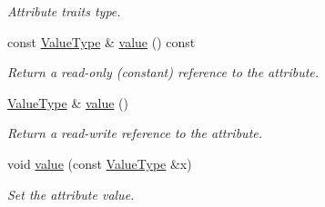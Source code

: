 \begin{DoxyCompactItemize}
\begin{DoxyCompactList}\small\item\em Attribute traits type. \item\end{DoxyCompactList}\item 
const \hyperlink{classopenstack_1_1xml_1_1AbsoluteLimit_ade5fbfd6ef570b66c9ad22f8339ef3f6}{ValueType} \& \hyperlink{classopenstack_1_1xml_1_1AbsoluteLimit_a6173fefecefbf3fb5f984ea1293c6eea}{value} () const 
\begin{DoxyCompactList}\small\item\em Return a read-\/only (constant) reference to the attribute. \item\end{DoxyCompactList}\item 
\hyperlink{classopenstack_1_1xml_1_1AbsoluteLimit_ade5fbfd6ef570b66c9ad22f8339ef3f6}{ValueType} \& \hyperlink{classopenstack_1_1xml_1_1AbsoluteLimit_a452c4de729595bbce70455276d4f9fed}{value} ()
\begin{DoxyCompactList}\small\item\em Return a read-\/write reference to the attribute. \item\end{DoxyCompactList}\item 
void \hyperlink{classopenstack_1_1xml_1_1AbsoluteLimit_ab5054853d76770137e900d4b2812c060}{value} (const \hyperlink{classopenstack_1_1xml_1_1AbsoluteLimit_ade5fbfd6ef570b66c9ad22f8339ef3f6}{ValueType} \&x)
\begin{DoxyCompactList}\small\item\em Set the attribute value. \item\end{DoxyCompactList}\end{DoxyCompactItemize}
